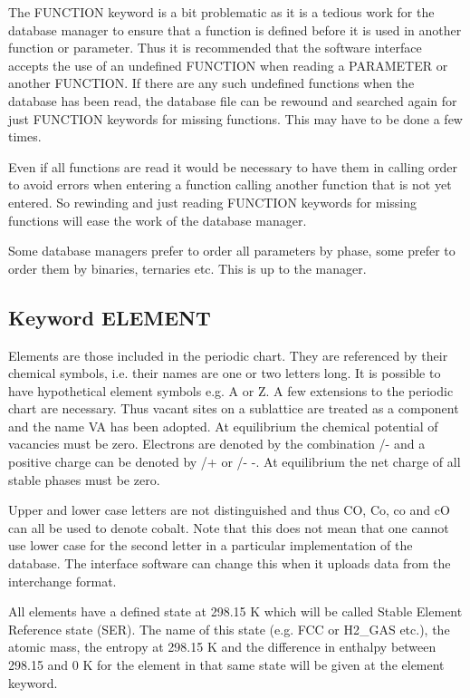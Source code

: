\documentclass[12pt]{article}
\begin{document}
The FUNCTION keyword is a bit problematic as it is a tedious work for
the database manager to ensure that a function is defined before it is
used in another function or parameter.  Thus it is recommended that
the software interface accepts the use of an undefined FUNCTION when
reading a PARAMETER or another FUNCTION.  If there are any such
undefined functions when the database has been read, the database file
can be rewound and searched again for just FUNCTION keywords for
missing functions.  This may have to be done a few times.

Even if all functions are read it would be necessary to have them in
calling order to avoid errors when entering a function calling another
function that is not yet entered.  So rewinding and just reading
FUNCTION keywords for missing functions will ease the work of the
database manager.

Some database managers prefer to order all parameters by phase, some
prefer to order them by binaries, ternaries etc.  This is up to the
manager.

\subsection{Keyword ELEMENT}

Elements are those included in the periodic chart.  They are
referenced by their chemical symbols, i.e.  their names are one or two
letters long.  It is possible to have hypothetical element symbols e.g.
A or Z.  A few extensions to the periodic chart are necessary.  Thus
vacant sites on a sublattice are treated as a component and the name
VA has been adopted.  At equilibrium the chemical potential of
vacancies must be zero.  Electrons are denoted by the combination /- and
a positive charge can be denoted by /+ or /- -.  At equilibrium the net charge of
all stable phases must be zero.

Upper and lower case letters are not distinguished and thus CO, Co, co
and cO can all be used to denote cobalt.  Note that this does not mean
that one cannot use lower case for the second letter in a particular
implementation of the database.  The interface software can change
this when it uploads data from the interchange format.

All elements have a defined state at 298.15 K which will be called
Stable Element Reference state (SER).  The name of this state (e.g.  FCC
or H2\_GAS etc.), the atomic mass, the entropy at 298.15 K and the
difference in enthalpy between 298.15 and 0 K for the element in that
same state will be given at the element keyword.
\end{document}
